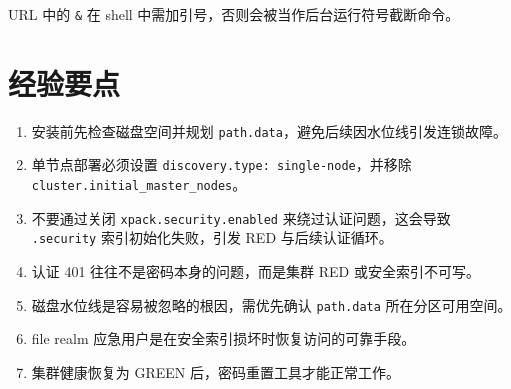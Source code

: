 \documentclass[11pt,a4paper,openany]{ctexbook}
\begin{document}
\begin{note}
URL 中的 \texttt{\&} 在 shell 中需加引号，否则会被当作后台运行符号截断命令。
\end{note}

\chapter{经验要点}

\begin{enumerate}[leftmargin=1.4em]
  \item 安装前先检查磁盘空间并规划 \texttt{path.data}，避免后续因水位线引发连锁故障。
  \item 单节点部署必须设置 \texttt{discovery.type: single-node}，并移除 \texttt{cluster.initial\_master\_nodes}。
  \item 不要通过关闭 \texttt{xpack.security.enabled} 来绕过认证问题，这会导致 \texttt{.security} 索引初始化失败，引发 RED 与后续认证循环。
  \item 认证 401 往往不是密码本身的问题，而是集群 RED 或安全索引不可写。
  \item 磁盘水位线是容易被忽略的根因，需优先确认 \texttt{path.data} 所在分区可用空间。
  \item file realm 应急用户是在安全索引损坏时恢复访问的可靠手段。
  \item 集群健康恢复为 GREEN 后，密码重置工具才能正常工作。
\end{enumerate}
\end{document}
